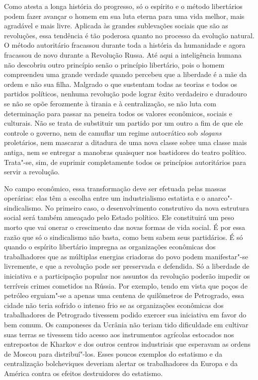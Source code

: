 Como atesta a longa história do progresso, só o espírito e o método
libertários podem fazer avançar o homem em sua luta eterna para uma
vida melhor, mais agradável e mais livre. Aplicada às grandes
sublevações sociais que são as revoluções, essa tendência é tão
poderosa quanto no processo da evolução natural. O método autoritário
fracassou durante toda a história da humanidade e agora fracassou de
novo durante a Revolução Russa. Até aqui a inteligência humana não
descobriu outro princípio senão o princípio libertário, pois o homem
compreendeu uma grande verdade quando percebeu que a liberdade é a mãe
da ordem e não sua filha. Malgrado o que sustentam todas as teorias e
todos os partidos políticos, nenhuma revolução pode 
lograr êxito verdadeiro e duradouro se não se opõe ferozmente à tirania e à
centralização, se não luta com determinação para passar na
peneira todos os valores econômicos, sociais e culturais. Não se trata
de substituir um partido por um outro a fim de que ele controle o
governo, nem de camuflar um regime autocrático sob \textit{slogans} proletários,
nem mascarar a ditadura de uma nova classe sobre uma classe mais
antiga, nem se entregar a manobras quaisquer nos bastidores do teatro
político. Trata"-se, sim, de suprimir completamente todos os princípios
autoritários para servir a revolução.

No campo econômico, essa transformação deve ser efetuada pelas massas
operárias: elas têm a escolha entre um industrialismo estatista e o
anarco"-sindicalismo. No primeiro caso, o desenvolvimento construtivo
da nova estrutura social será também ameaçado pelo Estado político. Ele
constituirá um peso morto que vai onerar o crescimento das novas
formas de vida social. É por essa razão que só o sindicalismo não
basta, como bem sabem seus partidários. É só quando o espírito
libertário impregna as organizações econômicas dos trabalhadores que as
múltiplas energias criadoras do povo podem manifestar"-se livremente,
e que a revolução pode ser preservada e defendida. Só a liberdade de
iniciativa e a participação popular nos assuntos da revolução poderão
impedir os terríveis crimes cometidos na Rússia. Por exemplo, tendo em
vista que poços de petróleo erguiam"-se a apenas uma centena de
quilômetros de Petrogrado, essa cidade não teria sofrido o intenso frio
se as organizações econômicas dos trabalhadores de Petrogrado tivessem
podido exercer sua iniciativa em favor do bem comum. Os camponeses da
Ucrânia não teriam tido dificuldade em cultivar suas terras se tivessem
tido acesso aos instrumentos agrícolas estocados nos entrepostos de
Kharkov e dos outros centros industriais que esperavam as ordens de
Moscou para distribuí"-los. Esses poucos exemplos do estatismo e da
centralização bolcheviques deveriam alertar os trabalhadores da Europa
e da América contra os efeitos destruidores do estatismo.

